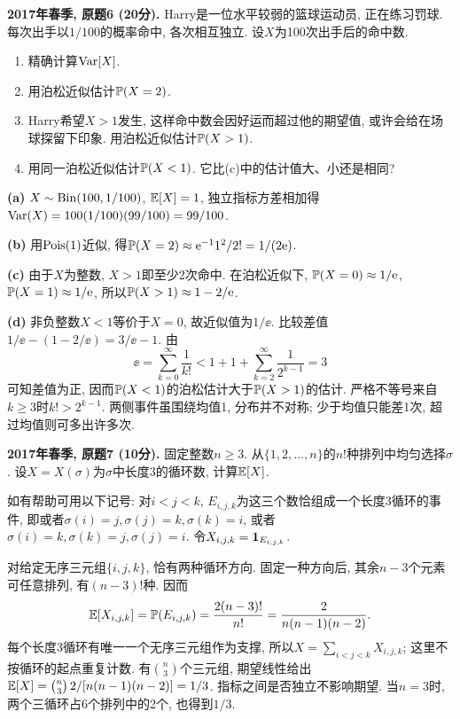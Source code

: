 \begin{exercise}\label{ex:m1-2017s-q6}
\textbf{2017年春季, 原题6 (20分).} Harry是一位水平较弱的篮球运动员, 正在练习罚球. 每次出手以$1/100$的概率命中, 各次相互独立. 设$X$为100次出手后的命中数.
\begin{enumerate}
\item[(a)]\label{ex:m1-2017s-q6-a} 精确计算$\operatorname{Var}[X]$.
\item[(b)]\label{ex:m1-2017s-q6-b} 用泊松近似估计$\mathbb P(X=2)$.
\item[(c)]\label{ex:m1-2017s-q6-c} Harry希望$X>1$发生, 这样命中数会因好运而超过他的期望值, 或许会给在场球探留下印象. 用泊松近似估计$\mathbb P(X>1)$.
\item[(d)]\label{ex:m1-2017s-q6-d} 用同一泊松近似估计$\mathbb P(X<1)$. 它比(c)中的估计值大、小还是相同?
\end{enumerate}
\end{exercise}
\begin{solution}
\textbf{(a)}\label{sol:m1-2017s-q6-a} $X\sim\operatorname{Bin}(100,1/100)$, $\mathbb E[X]=1$, 独立指标方差相加得$\operatorname{Var}(X)=100(1/100)(99/100)=99/100$.

\textbf{(b)}\label{sol:m1-2017s-q6-b} 用$\operatorname{Pois}(1)$近似, 得$\mathbb P(X=2)\approx\mathrm e^{-1}1^2/2!=1/(2\mathrm e)$.

\textbf{(c)}\label{sol:m1-2017s-q6-c} 由于$X$为整数, $X>1$即至少2次命中. 在泊松近似下, $\mathbb P(X=0)\approx1/\mathrm e$, $\mathbb P(X=1)\approx1/\mathrm e$, 所以$\mathbb P(X>1)\approx1-2/\mathrm e$.

\textbf{(d)}\label{sol:m1-2017s-q6-d} 非负整数$X<1$等价于$X=0$, 故近似值为$1/\ee$. 比较差值$1/\ee-(1-2/\ee)=3/\ee-1$. 由
\[
\ee=\sum_{k=0}^{\infty}\frac1{k!}<1+1+\sum_{k=2}^{\infty}\frac1{2^{k-1}}=3
\]
可知差值为正, 因而$\mathbb P(X<1)$的泊松估计大于$\mathbb P(X>1)$的估计. 严格不等号来自$k\ge3$时$k!>2^{k-1}$. 两侧事件虽围绕均值1, 分布并不对称; 少于均值只能差1次, 超过均值则可多出许多次.
\end{solution}

\begin{exercise}\label{ex:m1-2017s-q7}
\textbf{2017年春季, 原题7 (10分).} 固定整数$n\ge3$. 从$\{1,2,\ldots,n\}$的$n!$种排列中均匀选择$\sigma$. 设$X=X(\sigma)$为$\sigma$中长度3的循环数, 计算$\mathbb E[X]$.

如有帮助可用以下记号: 对$i<j<k$, $E_{i,j,k}$为这三个数恰组成一个长度3循环的事件, 即或者$\sigma(i)=j,\sigma(j)=k,\sigma(k)=i$, 或者$\sigma(i)=k,\sigma(k)=j,\sigma(j)=i$. 令$X_{i,j,k}=\mathbf 1_{E_{i,j,k}}$.
\end{exercise}
\begin{solution}
\label{sol:m1-2017s-q7}
对给定无序三元组$\{i,j,k\}$, 恰有两种循环方向. 固定一种方向后, 其余$n-3$个元素可任意排列, 有$(n-3)!$种. 因而
\[
\mathbb E[X_{i,j,k}]=\mathbb P(E_{i,j,k})=\frac{2(n-3)!}{n!}
=\frac2{n(n-1)(n-2)}.
\]
每个长度3循环有唯一一个无序三元组作为支撑, 所以$X=\sum_{i<j<k}X_{i,j,k}$; 这里不按循环的起点重复计数. 有$\binom n3$个三元组, 期望线性给出$\mathbb E[X]=\binom n3\,2/[n(n-1)(n-2)]=1/3$. 指标之间是否独立不影响期望. 当$n=3$时, 两个三循环占6个排列中的2个, 也得到$1/3$.
\end{solution}


